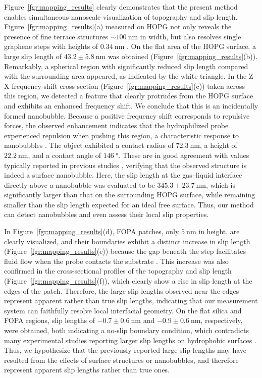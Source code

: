 \documentclass[journal=jacsat,manuscript=article]{achemso}
\begin{document}
Figure~\ref{fgr:mapping_results} clearly demonstrates that the present method enables simultaneous nanoscale visualization of topography and slip length. Figure~\ref{fgr:mapping_results}(a) measured on HOPG not only reveals the presence of fine terrace structures \(\sim\SI{100}{\nano\metre}\) in width, but also resolves single graphene steps with heights of \(\SI{0.34}{\nano\metre}\) \cite{Franklin1951-hy}. On the flat area of the HOPG surface, a large slip length of \(43.2 \pm \SI{5.8}{\nano\metre}\) was obtained (Figure~\ref{fgr:mapping_results}(b)). Remarkably, a spherical region with significantly reduced slip length compared with the surrounding area appeared, as indicated by the white triangle. In the Z-X frequency-shift cross section (Figure~\ref{fgr:mapping_results}(c)) taken across this region, we detected a feature that clearly protrudes from the HOPG surface and exhibits an enhanced frequency shift. We conclude that this is an incidentally formed nanobubble. Because a positive frequency shift corresponds to repulsive forces, the observed enhancement indicates that the hydrophilized probe experienced repulsion when pushing this region, a characteristic response to nanobubbles \cite{Teshima2018-cx, Teshima2020-vr}. The object exhibited a contact radius of \(\SI{72.3}{\nano\metre}\), a height of \(\SI{22.2}{\nano\metre}\), and a contact angle of \(\SI{146}{\degree}\). These are in good agreement with values typically reported in previous studies \cite{Zhang2014-ng, Wang2015-yj}, verifying that the observed structure is indeed a surface nanobubble. Here, the slip length at the gas--liquid interface directly above a nanobubble was evaluated to be \(345.3 \pm \SI{23.7}{\nano\meter}\), which is significantly larger than that on the surrounding HOPG surface, while remaining smaller than the slip length expected for an ideal free surface. Thus, our method can detect nanobubbles and even assess their local slip properties.

In Figure~\ref{fgr:mapping_results}(d), FOPA patches, only \(\SI{5}{\nano\metre}\) in height, are clearly visualized, and their boundaries exhibit a distinct increase in slip length (Figure~\ref{fgr:mapping_results}(e)) because the gap beneath the step facilitates fluid flow when the probe contacts the substrate \cite{Ybert2007-jv}. This increase was also confirmed in the cross-sectional profiles of the topography and slip length (Figure~\ref{fgr:mapping_results}(f)), which clearly show a rise in slip length at the edges of the patch. Therefore, the large slip lengths observed near the edges represent apparent rather than true slip lengths, indicating that our measurement system can faithfully resolve local interfacial geometry. On the flat silica and FOPA regions, slip lengths of \(-0.7 \pm \SI{0.6}{\nano\metre}\) and \(-0.9 \pm \SI{0.6}{\nano\metre}\), respectively, were obtained, both indicating a no-slip boundary condition, which contradicts many experimental studies reporting larger slip lengths on hydrophobic surfaces \cite{Wu2016-vv, Tretheway2002-et}. Thus, we hypothesize that the previously reported large slip lengths may have resulted from the effects of surface structures or nanobubbles, and therefore represent apparent slip lengths rather than true ones.
\end{document}
